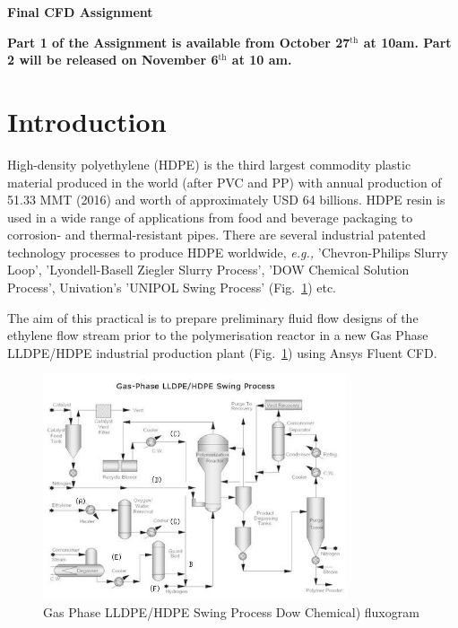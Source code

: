 \documentclass[12pts,a4paper,amsmath,amssymb,floatfix]{article}%
\newcommand{\eg}{{\it e.g., }}
\begin{document}
\begin{center}
  \Large{\bf Final CFD Assignment}
\end{center}

\begin{shaded}\begin{center}
{\bf Part 1 of the Assignment is available from October 27$^{\text{th}}$ at 10am. Part 2 will be released on November 6$^{\text{th}}$ at 10 am.}\end{center}
\end{shaded}

\section{Introduction}
High-density polyethylene (HDPE) is the third largest commodity plastic material produced in the world (after PVC and PP) with annual production of 51.33 MMT (2016) and worth of approximately USD 64 billions. HDPE resin is used in a wide range of applications from food and beverage packaging to corrosion- and thermal-resistant pipes. There are several industrial patented technology processes to produce HDPE worldwide, \eg 'Chevron-Philips Slurry Loop', 'Lyondell-Basell Ziegler Slurry Process', 'DOW Chemical Solution Process', Univation's 'UNIPOL Swing Process' (Fig.~\ref{HDPE_Plant}) etc.

\medskip
The aim of this practical is to prepare preliminary fluid flow designs of the ethylene flow stream prior to the polymerisation reactor in a new Gas Phase LLDPE/HDPE industrial production plant (Fig.~\ref{HDPE_Plant}) using Ansys Fluent CFD.

\begin{figure}[H]
  \begin{center}
     \includegraphics[width=0.8\textwidth,clip]{./Pics/hdpe_production_img2.jpg}
     \caption{Gas Phase LLDPE/HDPE Swing Process Dow Chemical) fluxogram}\label{HDPE_Plant}
  \end{center}
\end{figure}
\end{document}
